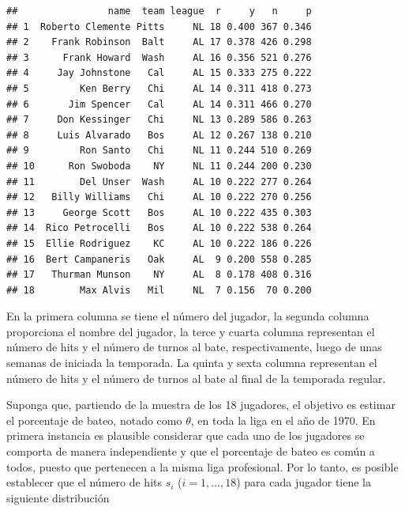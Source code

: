 \begin{Eje}
\begin{knitrout}
\begin{kframe}
{\ttfamily\noindent\itshape\color{messagecolor}{\#\# The following object is masked \_by\_ .GlobalEnv:\\\#\# \\\#\#\ \ \ \  n}}\begin{alltt}
\end{alltt}
\begin{verbatim}
##                name  team league  r     y   n     p
## 1  Roberto Clemente Pitts     NL 18 0.400 367 0.346
## 2    Frank Robinson  Balt     AL 17 0.378 426 0.298
## 3      Frank Howard  Wash     AL 16 0.356 521 0.276
## 4     Jay Johnstone   Cal     AL 15 0.333 275 0.222
## 5         Ken Berry   Chi     AL 14 0.311 418 0.273
## 6       Jim Spencer   Cal     AL 14 0.311 466 0.270
## 7     Don Kessinger   Chi     NL 13 0.289 586 0.263
## 8     Luis Alvarado   Bos     AL 12 0.267 138 0.210
## 9         Ron Santo   Chi     NL 11 0.244 510 0.269
## 10      Ron Swoboda    NY     NL 11 0.244 200 0.230
## 11        Del Unser  Wash     AL 10 0.222 277 0.264
## 12   Billy Williams   Chi     AL 10 0.222 270 0.256
## 13     George Scott   Bos     AL 10 0.222 435 0.303
## 14  Rico Petrocelli   Bos     AL 10 0.222 538 0.264
## 15  Ellie Rodriguez    KC     AL 10 0.222 186 0.226
## 16  Bert Campaneris   Oak     AL  9 0.200 558 0.285
## 17   Thurman Munson    NY     AL  8 0.178 408 0.316
## 18        Max Alvis   Mil     NL  7 0.156  70 0.200
\end{verbatim}
\end{kframe}
\end{knitrout}
    
    En la primera columna se tiene el n\'umero del jugador, la segunda columna proporciona el nombre del jugador, la terce y cuarta columna representan el n\'umero de hits y el n\'umero de turnos al bate, respectivamente, luego de unas semanas de iniciada la temporada. La quinta y sexta columna representan el n\'umero de hits y el n\'umero de turnos al bate al final de la temporada regular.
    
    Suponga que, partiendo de la muestra de los 18 jugadores, el objetivo es estimar el porcentaje de bateo, notado como $\theta$, en toda la liga en el a\~no de 1970. En primera instancia es plausible considerar que cada uno de los jugadores se comporta de manera independiente y que el porcentaje de bateo es com\'un a todos, puesto que pertenecen a la misma liga profesional. Por lo tanto, es posible establecer que el n\'umero de hits $s_i$ ($i=1,\ldots,18$) para cada jugador tiene la siguiente distribuci\'on
    

\end{Eje}
